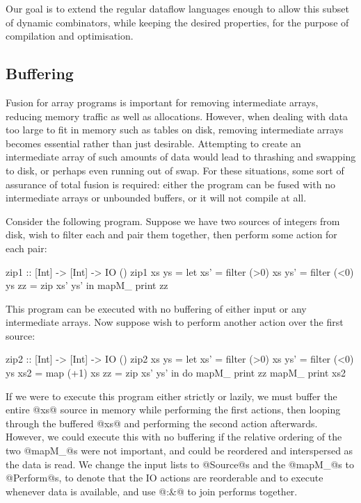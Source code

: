 Our goal is to extend the regular dataflow languages enough to allow this subset of dynamic combinators, while keeping the desired properties, for the purpose of compilation and optimisation.

\subsection{Buffering}

Fusion for array programs is important for removing intermediate arrays, reducing memory traffic as well as allocations.
However, when dealing with data too large to fit in memory such as tables on disk, removing intermediate arrays becomes essential rather than just desirable.
Attempting to create an intermediate array of such amounts of data would lead to thrashing and swapping to disk, or perhaps even running out of swap.
For these situations, some sort of assurance of total fusion is required: either the program can be fused with no intermediate arrays or unbounded buffers, or it will not compile at all.

Consider the following program.
Suppose we have two sources of integers from disk, wish to filter each and pair them together, then perform some action for each pair:

\begin{code}
zip1 :: [Int] -> [Int] -> IO ()
zip1 xs ys
 = let xs'  = filter (>0) xs
       ys'  = filter (<0) ys
       zz   = zip xs' ys'
   in  mapM_ print        zz
\end{code}

This program can be executed with no buffering of either input or any intermediate arrays.
Now suppose wish to perform another action over the first source:

\begin{code}
zip2 :: [Int] -> [Int] -> IO ()
zip2 xs ys
 = let xs'  = filter (>0) xs
       ys'  = filter (<0) ys
       xs2  = map    (+1) xs
       zz   = zip xs' ys'
   in  do   mapM_ print   zz
            mapM_ print   xs2
\end{code}

If we were to execute this program either strictly or lazily, we must buffer the entire @xs@ source in memory while performing the first actions, then looping through the buffered @xs@ and performing the second action afterwards.
However, we could execute this with no buffering if the relative ordering of the two @mapM_@s were not important, and could be reordered and interspersed as the data is read.
We change the input lists to @Source@s and the @mapM_@s to @Perform@s, to denote that the IO actions are reorderable and to execute whenever data is available, and use @:&@ to join performs together.

